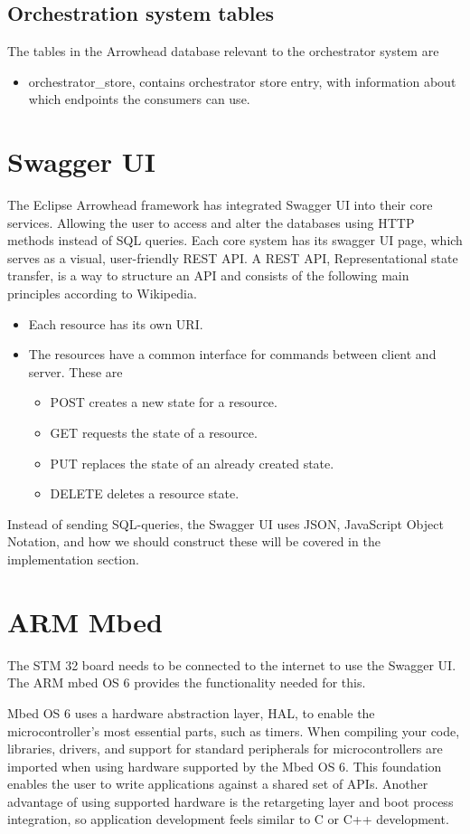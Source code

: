 \subsection{Orchestration system tables}
The tables in the Arrowhead database relevant to the orchestrator system are
\begin{itemize}
    \item orchestrator\_store,  contains orchestrator store entry, with information about which endpoints the consumers can use.
\end{itemize}

\section{Swagger UI}
The Eclipse Arrowhead framework has integrated Swagger UI into their core services. 
Allowing the user to access and alter the databases using HTTP methods instead of SQL queries.
Each core system has its swagger UI page, which serves as a visual, user-friendly REST API. 
A REST API, Representational state transfer, is a way to structure an API and consists of the following main principles according to Wikipedia.\cite{WIKIREST2021}
\begin{itemize}
    \item Each resource has its own URI.
    \item The resources have a common interface for commands between client and server. These are
    \begin{itemize}
        \item POST creates a new state for a resource.
        \item GET requests the state of a resource.
        \item PUT replaces the state of an already created state.
        \item DELETE deletes a resource state.
    \end{itemize}
\end{itemize}
Instead of sending SQL-queries, the Swagger UI uses JSON, JavaScript Object Notation, and how we should construct these will be covered in the implementation section.
\section{ARM Mbed}
The  STM 32 board needs to be connected to the internet to use the Swagger UI. 
The ARM mbed OS 6 provides the functionality needed for this. 

Mbed OS 6 uses a hardware abstraction layer, HAL, to enable the microcontroller's most essential parts, such as timers.
When compiling your code,  libraries, drivers, and support for standard peripherals for microcontrollers are imported when using hardware supported by the Mbed OS 6.
This foundation enables the user to write applications against a shared set of APIs.
Another advantage of using supported hardware is the retargeting layer and boot process integration, so application development feels similar to C or C++ development.

